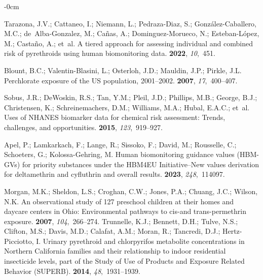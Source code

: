 \documentclass[toxics,article,accept,pdftex,moreauthors]{Definitions/mdpi}
\begin{document}
\begin{adjustwidth}{-\extralength}{0cm}
\begin{thebibliography}{999}
Tarazona, J.V.; Cattaneo, I.; Niemann, L.; Pedraza-Diaz, S.;
  Gonz{\'a}lez-Caballero, M.C.; de~Alba-Gonzalez, M.; Ca{\~n}as, A.;
  Dominguez-Morueco, N.; Esteban-L{\'o}pez, M.; Casta{\~n}o, A.;  et~al.
\newblock A tiered approach for assessing individual and combined risk of
  pyrethroids using human biomonitoring data.
 {\bf 2022}, {\em 10},~451.

Blount, B.C.; Valentin-Blasini, L.; Osterloh, J.D.; Mauldin, J.P.; Pirkle, J.L.
\newblock Perchlorate exposure of the US population, 2001--2002.
 {\bf
  2007}, {\em 17},~400--407.

Sobus, J.R.; DeWoskin, R.S.; Tan, Y.M.; Pleil, J.D.; Phillips, M.B.; George,
  B.J.; Christensen, K.; Schreinemachers, D.M.; Williams, M.A.; Hubal, E.A.C.;
  et~al.
\newblock Uses of NHANES biomarker data for chemical risk assessment: Trends,
  challenges, and opportunities.
 {\bf 2015}, {\em
  123},~919--927.

Apel, P.; Lamkarkach, F.; Lange, R.; Sissoko, F.; David, M.; Rousselle, C.;
  Schoeters, G.; Kolossa-Gehring, M.
\newblock Human biomonitoring guidance values (HBM-GVs) for priority substances
  under the HBM4EU Initiative--New values derivation for deltamethrin and
  cyfluthrin and overall results.
 {\bf
  2023}, {\em 248},~114097.

Morgan, M.K.; Sheldon, L.S.; Croghan, C.W.; Jones, P.A.; Chuang, J.C.; Wilson,
  N.K.
\newblock An observational study of 127 preschool children at their homes and
  daycare centers in Ohio: Environmental pathways to cis-and trans-permethrin
  exposure.
 {\bf 2007}, {\em 104},~266--274.
\newpage
{}
Trunnelle, K.J.; Bennett, D.H.; Tulve, N.S.; Clifton, M.S.; Davis, M.D.;
  Calafat, A.M.; Moran, R.; Tancredi, D.J.; Hertz-Picciotto, I.
\newblock Urinary pyrethroid and chlorpyrifos metabolite concentrations in
  Northern California families and their relationship to indoor residential
  insecticide levels, part of the Study of Use of Products and Exposure Related
  Behavior (SUPERB).
 {\bf 2014}, {\em
  48},~1931--1939.


\end{thebibliography}
\end{adjustwidth}
\end{document}
